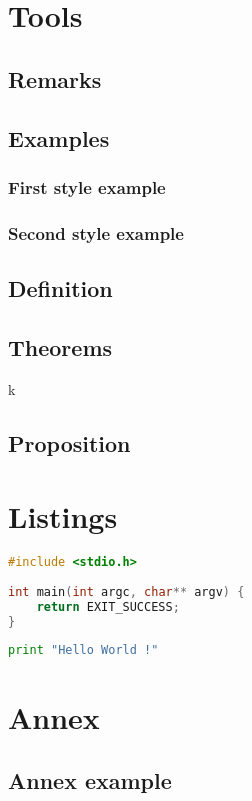 \documentclass[12pt,a4paper,openany]{book}
\begin{document}
	\thispagestyle{empty} %
	\titleBC 
	\dominitoc
	\setcounter{tocdepth}{1}
	\setcounter{secnumdepth}{3}
	\setcounter{minitocdepth}{1}

	\chapter{Tools}
	\section{Remarks}
	\begin{remarque}
		\lipsum[1]
	\end{remarque}
	\section{Examples}
	\subsection{First style example}
	\begin{example}
		\lipsum[1]
	\end{example}
	\subsection{Second style example}
	\begin{exemple}
		\lipsum[1]
	\end{exemple}
	\section{Definition}
	\begin{definition}
		\lipsum[1]
	\end{definition}
	\section{Theorems}
	\begin{theorem}
		\lipsum[1]k
	\end{theorem}
	\section{Proposition}
	\begin{proposition}
	\lipsum[1]	
	\end{proposition}
	\chapter{Listings}
\begin{lstlisting}[language=C, caption=An hello World in C language]
#include <stdio.h>
	 
int main(int argc, char** argv) {
	return EXIT_SUCCESS;
}
\end{lstlisting}

\begin{lstlisting}[language=Python, caption=An hello World in Python language]
print "Hello World !"
\end{lstlisting}
\appendix
\chapter{Annex}
\section{Annex example}
	
\end{document}
